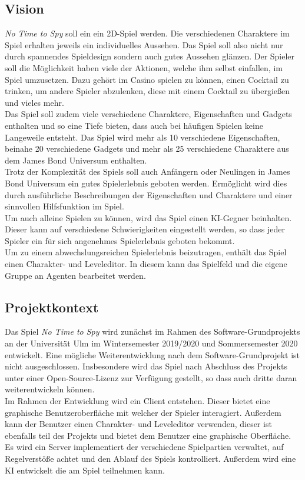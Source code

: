 \subsection{Vision}
\textit{No Time to Spy} soll ein ein 2D-Spiel werden. Die verschiedenen Charaktere im Spiel erhalten jeweils ein individuelles Aussehen. Das Spiel soll also nicht nur durch spannendes Spieldesign sondern auch gutes Aussehen glänzen. Der Spieler soll die Möglichkeit haben viele der Aktionen, welche ihm selbst einfallen, im Spiel umzusetzen. Dazu gehört im Casino spielen zu können, einen Cocktail zu trinken, um andere Spieler abzulenken, diese mit einem Cocktail zu übergießen und vieles mehr.\\
Das Spiel soll zudem viele verschiedene Charaktere, Eigenschaften und Gadgets enthalten und so eine Tiefe bieten, dass auch bei häufigen Spielen keine Langeweile entsteht. Das Spiel wird mehr als 10 verschiedene Eigenschaften, beinahe 20 verschiedene Gadgets und mehr als 25 verschiedene Charaktere aus dem James Bond Universum enthalten. \\
Trotz der Komplexität des Spiels soll auch Anfängern oder Neulingen in James Bond Universum ein gutes Spielerlebnis geboten werden. Ermöglicht wird dies durch ausführliche Beschreibungen der Eigenschaften und Charaktere und einer sinnvollen Hilfsfunktion im Spiel.\\
Um auch alleine Spielen zu können, wird das Spiel einen KI-Gegner beinhalten. Dieser kann auf verschiedene Schwierigkeiten eingestellt werden, so dass jeder Spieler ein für sich angenehmes Spielerlebnis geboten bekommt.\\
Um zu einem abwechslungsreichen Spielerlebnis beizutragen, enthält das Spiel einen Charakter- und Leveleditor. In diesem kann das Spielfeld und die eigene Gruppe an Agenten bearbeitet werden. 

\subsection{Projektkontext}
Das Spiel \textit{No Time to Spy} wird zunächst im Rahmen des Software-Grundprojekts an der Universität Ulm im Wintersemester 2019/2020 und Sommersemester 2020 entwickelt.
Eine mögliche Weiterentwicklung nach dem Software-Grundprojekt ist nicht ausgeschlossen. Insbesondere wird das Spiel nach Abschluss des Projekts unter einer Open-Source-Lizenz zur Verfügung gestellt, so dass auch dritte daran weiterentwickeln können.\\

Im Rahmen der Entwicklung wird ein Client entstehen. Dieser bietet eine graphische Benutzeroberfläche mit welcher der Spieler interagiert. Außerdem kann der Benutzer einen Charakter- und Leveleditor verwenden, dieser ist ebenfalls teil des Projekts und bietet dem Benutzer eine graphische Oberfläche.\\
Es wird ein Server implementiert der verschiedene Spielpartien verwaltet, auf Regelverstöße achtet und den Ablauf des Spiels kontrolliert. Außerdem wird eine KI entwickelt die am Spiel teilnehmen kann.
